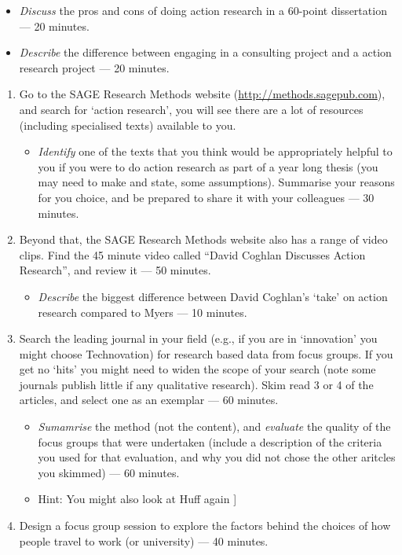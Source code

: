 \documentclass[]{book}
\providecommand{\tightlist}{%
  \setlength{\itemsep}{0pt}\setlength{\parskip}{0pt}}
\theoremstyle{definition}
\theoremstyle{definition}
\theoremstyle{definition}
\theoremstyle{remark}
\begin{document}
\begin{itemize}
\item
  \emph{Discuss} the pros and cons of doing action research in a
  60-point dissertation --- 20 minutes.
\item
  \emph{Describe} the difference between engaging in a consulting
  project and a action research project --- 20 minutes.
\end{itemize}

\begin{enumerate}
\def\labelenumi{\arabic{enumi}.}
\setcounter{enumi}{1}
\item
  Go to the SAGE Research Methods website
  (\url{http://methods.sagepub.com}), and search for `action research',
  you will see there are a lot of resources (including specialised
  texts) available to you.

  \begin{itemize}
  \tightlist
  \item
    \emph{Identify} one of the texts that you think would be
    appropriately helpful to you if you were to do action research as
    part of a year long thesis (you may need to make and state, some
    assumptions). Summarise your reasons for you choice, and be prepared
    to share it with your colleagues --- 30 minutes.
  \end{itemize}
\item
  Beyond that, the SAGE Research Methods website also has a range of
  video clips. Find the 45 minute video called ``David Coghlan Discusses
  Action Research'', and review it --- 50 minutes.

  \begin{itemize}
  \tightlist
  \item
    \emph{Describe} the biggest difference between David Coghlan's
    `take' on action research compared to Myers
    \autocite*{myers_2013_qualitativeresearchbusiness} --- 10 minutes.
  \end{itemize}
\item
  Search the leading journal in your field (e.g., if you are in
  `innovation' you might choose Technovation) for research based data
  from focus groups. If you get no `hits' you might need to widen the
  scope of your search (note some journals publish little if any
  qualitative research). Skim read 3 or 4 of the articles, and select
  one as an exemplar --- 60 minutes.

  \begin{itemize}
  \item
    \emph{Sumamrise} the method (not the content), and \emph{evaluate}
    the quality of the focus groups that were undertaken (include a
    description of the criteria you used for that evaluation, and why
    you did not chose the other aritcles you skimmed) --- 60 minutes.
  \item
    Hint: You might also look at Huff again \autocite[e.d.,][
    p.~251--268]{huff_2009_designingresearchpublication}{]}
  \end{itemize}
\item
  Design a focus group session to explore the factors behind the choices
  of how people travel to work (or university) --- 40 minutes.
\end{enumerate}
\end{document}
